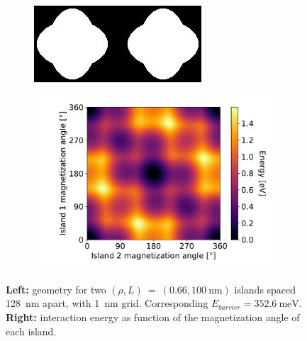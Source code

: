 \documentclass[11pt,a4paper,english]{article}
\begin{document}
\begin{figure}
    \centering
    \begin{subfigure}[c]{4cm} %
         \centering
         \includegraphics[width=\textwidth]{Figures/two_islands/Geometry/geom_r0.66_s100_d128_a0,0_cell1nm.png}
     \end{subfigure}
    \begin{subfigure}[c]{0.7\columnwidth}
         \centering
         \includegraphics[width=\textwidth]{Figures/two_islands/EnergyLandscape/Int_a0Pi,0Pi_d128_r0.66,0.66_cell1nm.pdf}
     \end{subfigure}
    \caption{\textbf{Left:} geometry for two $(\rho, L)~=~(0.66, \SI{100}{\nano\metre})$ islands spaced \SI{128}{\nano\metre} apart, with \SI{1}{\nano\metre} grid. Corresponding $E_{barrier}=\SI{352.6}{\milli\electronvolt}$. \textbf{Right:} interaction energy as function of the magnetization angle of each island.}
    \label{fig:two-islands_interaction_(r0.66_L100)_a0and0}
\end{figure}
\end{document}
